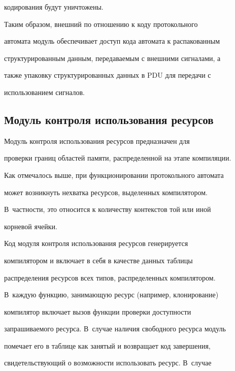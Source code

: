 кодирования будут уничтожены.


      


      Таким образом, внешний по отношению к коду протокольного 


автомата модуль обеспечивает доступ кода автомата к распакованным 


структурированным данным, передаваемым с внешними сигналами, а 


также упаковку структурированных данных в PDU для передачи с 


использованием сигналов.


      


      \subsection{Модуль контроля использования ресурсов}


      


      Модуль контроля использования ресурсов предназначен для 


проверки границ областей памяти, распределенной на этапе компиляции. 


Как отмечалось выше, при функционировании протокольного автомата 


может возникнуть нехватка ресурсов, выделенных компилятором. 


      В~част\-ности, это относится к количеству контекстов той или иной 


корневой ячейки.


      


      Код модуля контроля использования ресурсов генерируется 


компилятором и включает в себя в качестве данных таблицы 


распределения ресурсов всех типов, распределенных компилятором. 


В~каж\-дую функцию, занимающую ресурс (например, клонирование) 


компилятор включает вызов функции проверки доступности 


запрашиваемого ресурса. В~случае наличия свободного ресурса модуль 


помечает его в таблице как занятый и возвращает код завершения, 


свидетельствующий о возможности использовать ресурс. В~случае 


